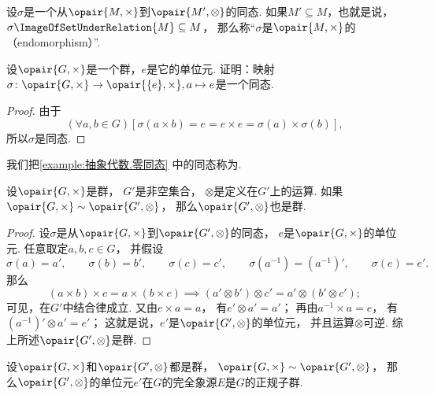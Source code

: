 \begin{definition}
设\(\sigma\)是一个从\(\opair{M,\times}\)到\(\opair{M',\otimes}\)的同态.
如果\(M' \subseteq M\)，也就是说，\(\sigma\ImageOfSetUnderRelation{M}\subseteq M\)，
那么称“\(\sigma\)是\(\opair{M,\times}\)的（endomorphism）”.
\end{definition}

\begin{example}\label{example:抽象代数.零同态}
设\(\opair{G,\times}\)是一个群，\(e\)是它的单位元.
证明：映射\(\sigma\colon\opair{G,\times}\to\opair{\{e\},\times},a\mapsto e\)是一个同态.
\begin{proof}
由于\[
	(\forall a,b\in G)[
		\sigma(a \times b)
		= e
		= e \times e
		= \sigma(a) \times \sigma(b)
	],
\]
所以\(\sigma\)是同态.
\end{proof}
\end{example}
我们把\cref{example:抽象代数.零同态} 中的同态称为.

\begin{theorem}\label{theorem:抽象代数.群的同态象是群}
设\(\opair{G,\times}\)是群，
\(G'\)是非空集合，
\(\otimes\)是定义在\(G'\)上的运算.
如果\(\opair{G,\times}\Homomorphism\opair{G',\otimes}\)，
那么\(\opair{G',\otimes}\)也是群.
\begin{proof}
设\(\sigma\)是从\(\opair{G,\times}\)到\(\opair{G',\otimes}\)的同态，
\(e\)是\(\opair{G,\times}\)的单位元.
任意取定\(a,b,c\in G\)，
并假设\[
	\sigma(a)=a', \qquad
	\sigma(b)=b', \qquad
	\sigma(c)=c', \qquad
	\sigma(a^{-1})=(a^{-1})', \qquad
	\sigma(e)=e'.
\]
那么\[
	(a \times b)\times c = a \times(b \times c)
	\implies
	(a' \otimes b')\otimes c' = a' \otimes(b' \otimes c');
\]
可见，在\(G'\)中结合律成立.
又由\(e\times a=a\)，
有\(e'\otimes a'=a'\)；
再由\(a^{-1}\times a=e\)，
有\((a^{-1})'\otimes a'=e'\)；
这就是说，\(e'\)是\(\opair{G',\otimes}\)的单位元，
并且运算\(\otimes\)可逆.
综上所述\(\opair{G',\otimes}\)是群.
\end{proof}
\end{theorem}

\begin{theorem}
设\(\opair{G,\times}\)和\(\opair{G',\otimes}\)都是群，
\(\opair{G,\times}\Homomorphism\opair{G',\otimes}\)，
那么\(\opair{G',\otimes}\)的单位元\(e'\)在\(G\)的完全象源\(E\)是\(G\)的正规子群.
\end{theorem}
